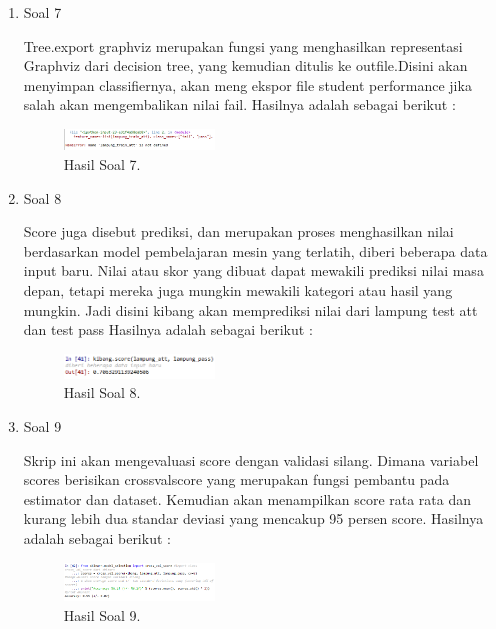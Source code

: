 \begin{enumerate}
	\item Soal 7
	\hfill\break
	
	Tree.export graphviz merupakan fungsi yang menghasilkan representasi Graphviz dari decision tree, yang kemudian ditulis ke outfile.Disini akan menyimpan classifiernya, akan meng ekspor file student performance jika salah akan mengembalikan nilai fail. Hasilnya adalah sebagai berikut :
	\begin{figure}[H]
	\centering
		\includegraphics[width=4cm]{figures/1174017/2/hasilsoal7.PNG}
		\caption{Hasil Soal 7.}
	\end{figure}

	\item Soal 8
	\hfill\break
	
	Score juga disebut prediksi, dan merupakan proses menghasilkan nilai berdasarkan model pembelajaran mesin yang terlatih, diberi beberapa data input baru. Nilai atau skor yang dibuat dapat mewakili prediksi nilai masa depan, tetapi mereka juga mungkin mewakili kategori atau hasil yang mungkin. Jadi disini kibang akan memprediksi nilai dari lampung test att dan test pass Hasilnya adalah sebagai berikut :
	\begin{figure}[H]
	\centering
		\includegraphics[width=4cm]{figures/1174017/2/hasilsoal8.PNG}
		\caption{Hasil Soal 8.}
	\end{figure}

	\item Soal 9
	\hfill\break
	
	Skrip ini akan mengevaluasi score dengan validasi silang. Dimana variabel scores berisikan crossvalscore yang merupakan fungsi pembantu pada estimator dan dataset. Kemudian akan menampilkan score rata rata dan kurang lebih dua standar deviasi yang mencakup 95 persen score. Hasilnya adalah sebagai berikut :
	\begin{figure}[H]
	\centering
		\includegraphics[width=4cm]{figures/1174017/2/hasilsoal9.PNG}
		\caption{Hasil Soal 9.}
	\end{figure}


\end{enumerate}
